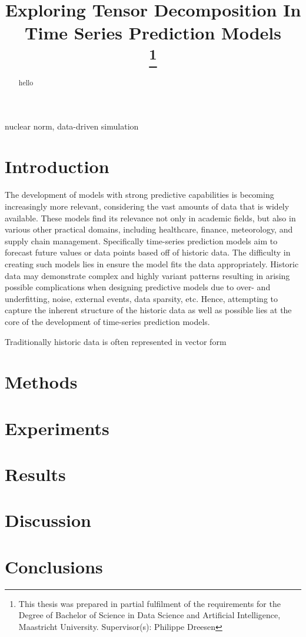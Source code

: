 \documentclass[conference]{IEEEtran}
\begin{document}
\title{Exploring Tensor Decomposition In Time Series Prediction Models\\
\thanks{This thesis was prepared in partial fulfilment of the requirements for the Degree of Bachelor of Science in Data Science and Artificial Intelligence, Maastricht University. Supervisor(s): Philippe Dreesen}
}

\author{
}

\maketitle

\begin{abstract}
hello
\end{abstract}

\begin{IEEEkeywords}
nuclear norm, data-driven simulation
\end{IEEEkeywords}

\section{Introduction}
The development of models with strong predictive capabilities is becoming increasingly more relevant, considering the vast amounts of data that is widely available. These models find its relevance not only in academic fields, but also in various other practical domains, including healthcare, finance, meteorology, and supply chain management. Specifically time-series prediction models aim to forecast future values or data points based off of historic data. The difficulty in creating such models lies in ensure the model fits the data appropriately. Historic data may demonstrate complex and highly variant patterns resulting in arising possible complications when designing predictive models due to over- and underfitting, noise, external events, data sparsity, etc. Hence, attempting to capture the inherent structure of the historic data as well as possible lies at the core of the development of time-series prediction models. 

Traditionally historic data is often represented in vector form



\section{Methods}
\section{Experiments}
\section{Results}
\section{Discussion}
\section{Conclusions}

\end{document}
